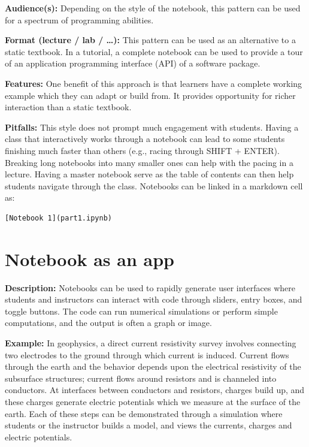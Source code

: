 \documentclass[]{book}
\begin{document}
\textbf{Audience(s):} Depending on the style of the notebook, this
pattern can be used for a spectrum of programming abilities.

\textbf{Format (lecture / lab / \ldots{}):} This pattern can be used as
an alternative to a static textbook. In a tutorial, a complete notebook
can be used to provide a tour of an application programming interface
(API) of a software package.

\textbf{Features:} One benefit of this approach is that learners have a
complete working example which they can adapt or build from. It provides
opportunity for richer interaction than a static textbook.

\textbf{Pitfalls:} This style does not prompt much engagement with
students. Having a class that interactively works through a notebook can
lead to some students finishing much faster than others (e.g., racing
through SHIFT + ENTER). Breaking long notebooks into many smaller ones
can help with the pacing in a lecture. Having a master notebook serve as
the table of contents can then help students navigate through the class.
Notebooks can be linked in a markdown cell as:

\begin{verbatim}
[Notebook 1](part1.ipynb)
\end{verbatim}

\section{Notebook as an app}\label{notebook-as-an-app}

\textbf{Description:} Notebooks can be used to rapidly generate user
interfaces where students and instructors can interact with code through
sliders, entry boxes, and toggle buttons. The code can run numerical
simulations or perform simple computations, and the output is often a
graph or image.

\textbf{Example:} In geophysics, a direct current resistivity survey
involves connecting two electrodes to the ground through which current
is induced. Current flows through the earth and the behavior depends
upon the electrical resistivity of the subsurface structures; current
flows around resistors and is channeled into conductors. At interfaces
between conductors and resistors, charges build up, and these charges
generate electric potentials which we measure at the surface of the
earth. Each of these steps can be demonstrated through a simulation
where students or the instructor builds a model, and views the currents,
charges and electric potentials.
\end{document}
